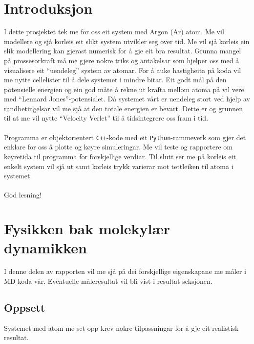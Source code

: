 \documentclass[12pt, a4paper]{article}
\theoremstyle{definition} \newtheorem*{definition}{Teorem}
\begin{document}
\newpage
    \tableofcontents
\newpage

\section*{Introduksjon}
    I dette prosjektet tek me for oss eit system med Argon (Ar) atom. Me vil modellere og sjå korleis eit slikt system utvikler seg over tid.
    Me vil sjå korleis ein slik modellering kan gjerast numerisk for å gje eit bra resultat. Grunna mangel på prossesorkraft må me gjere nokre triks og antakelsar
    som hjelper oss med å visualisere eit ``uendeleg'' system av atomar. For å auke hastigheita på koda vil me nytte cellelister til å dele systemet i mindre bitar.
    Eit godt mål på den potensielle energien og ein god måte å rekne ut krafta mellom atoma på vil vere med ``Lennard Jones''-potensialet. Då systemet vårt er 
    uendeleg stort ved hjelp av randbetingelsar vil me sjå at den totale energien er bevart. Dette er og grunnen til at me vil nytte ``Velocity Verlet'' til å 
    tidsintegrere oss fram i tid. \\ \\

    Programma er objektorientert \verb!C++!-kode med eit \verb!Python!-rammeverk som gjer det enklare for oss å plotte og køyre simuleringar.
    Me vil teste og rapportere om køyretida til programma for forskjellige verdiar. Til slutt ser me på korleis eit enkelt system vil sjå ut samt korleis trykk
    varierar mot tettleiken til atoma i systemet. \\ \\

    God lesning!



\newpage


\section*{Fysikken bak molekylær dynamikken}
    I denne delen av rapporten vil me sjå på dei forskjellige eigenskapane me måler i MD-koda vår. Eventuelle måleresultat vil bli vist i resultat-seksjonen.

    \subsection*{Oppsett}
        Systemet med atom me set opp krev nokre tilpassningar for å gje eit realistisk resultat. 
\end{document}
